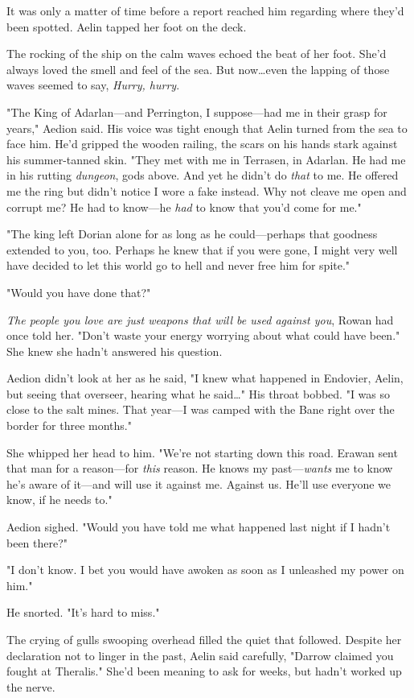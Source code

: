 It was only a matter of time before a report reached him regarding where they'd been spotted.
Aelin tapped her foot on the deck.

The rocking of the ship on the calm waves echoed the beat of her foot.
She'd always loved the smell and feel of the sea.
But now\ldots even the lapping of those waves seemed to say, \emph{Hurry, hurry}.

"The King of Adarlan---and Perrington, I suppose---had me in their grasp for years," Aedion said.
His voice was tight enough that Aelin turned from the sea to face him.
He'd gripped the wooden railing, the scars on his hands stark against his summer-tanned skin.
"They met with me in Terrasen, in Adarlan.
He had me in his rutting \emph{dungeon}, gods above.
And yet he didn't do \emph{that} to me.
He offered me the ring but didn't notice I wore a fake instead.
Why not cleave me open and corrupt me?
He had to know---he \emph{had} to know that you'd come for me."

"The king left Dorian alone for as long as he could---perhaps that goodness extended to you, too.
Perhaps he knew that if you were gone, I might very well have decided to let this world go to hell and never free him for spite."

"Would you have done that?"

\emph{The people you love are just weapons that will be used against you}, Rowan had once told her.
"Don't waste your energy worrying about what could have been."
She knew she hadn't answered his question.

Aedion didn't look at her as he said, "I knew what happened in Endovier, Aelin, but seeing that overseer, hearing what he said\ldots" His throat bobbed.
"I was so close to the salt mines.
That year---I was camped with the Bane right over the border for three months."

She whipped her head to him.
"We're not starting down this road.
Erawan sent that man for a reason---for \emph{this} reason.
He knows my past---\emph{wants} me to know he's aware of it---and will use it against me.
Against us.
He'll use everyone we know, if he needs to."

Aedion sighed.
"Would you have told me what happened last night if I hadn't been there?"

"I don't know.
I bet you would have awoken as soon as I unleashed my power on him."

He snorted.
"It's hard to miss."

The crying of gulls swooping overhead filled the quiet that followed.
Despite her declaration not to linger in the past, Aelin said carefully, "Darrow claimed you fought at Theralis."
She'd been meaning to ask for weeks, but hadn't worked up the nerve.

